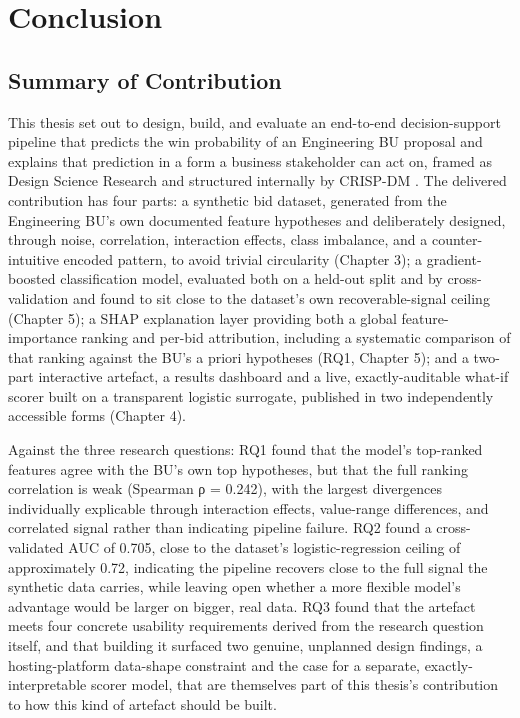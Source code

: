 \documentclass[12pt,oneside]{report}
\begin{document}
\hypertarget{conclusion}{%
\chapter{Conclusion}\label{conclusion}}

\hypertarget{summary-of-contribution}{%
\section{Summary of Contribution}\label{summary-of-contribution}}

This thesis set out to design, build, and evaluate an end-to-end
decision-support pipeline that predicts the win probability of an
Engineering BU proposal and explains that prediction in a form a
business stakeholder can act on, framed as Design Science Research
\citep{peffers2007design, hevner2004design} and structured internally by
CRISP-DM \citep{chapman2000crispdm}. The delivered contribution has four
parts: a synthetic bid dataset, generated from the Engineering BU's own
documented feature hypotheses and deliberately designed, through noise,
correlation, interaction effects, class imbalance, and a
counter-intuitive encoded pattern, to avoid trivial circularity (Chapter
3); a gradient-boosted classification model, evaluated both on a
held-out split and by cross-validation and found to sit close to the
dataset's own recoverable-signal ceiling (Chapter 5); a SHAP explanation
layer providing both a global feature-importance ranking and per-bid
attribution, including a systematic comparison of that ranking against
the BU's a priori hypotheses (RQ1, Chapter 5); and a two-part
interactive artefact, a results dashboard and a live, exactly-auditable
what-if scorer built on a transparent logistic surrogate, published in
two independently accessible forms (Chapter 4).

Against the three research questions: RQ1 found that the model's
top-ranked features agree with the BU's own top hypotheses, but that the
full ranking correlation is weak (Spearman ρ = 0.242), with the largest
divergences individually explicable through interaction effects,
value-range differences, and correlated signal rather than indicating
pipeline failure. RQ2 found a cross-validated AUC of 0.705, close to the
dataset's logistic-regression ceiling of approximately 0.72, indicating
the pipeline recovers close to the full signal the synthetic data
carries, while leaving open whether a more flexible model's advantage
would be larger on bigger, real data. RQ3 found that the artefact meets
four concrete usability requirements derived from the research question
itself, and that building it surfaced two genuine, unplanned design
findings, a hosting-platform data-shape constraint and the case for a
separate, exactly-interpretable scorer model, that are themselves part
of this thesis's contribution to how this kind of artefact should be
built.
\end{document}
